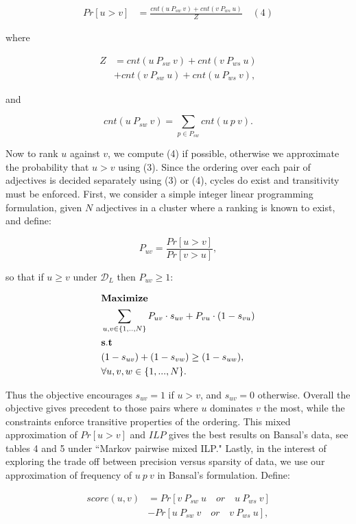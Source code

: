 \begin{align*}
Pr[u > v] &= \frac{cnt(u \: P_{sw} \: v) + cnt(v \: P_{ws} \: u)}{Z} \quad (4)
\end{align*}

where 

\begin{align*}
Z &= cnt(u \: P_{sw} \: v) + cnt(v \: P_{ws} \: u)\\
  &+ cnt(v \: P_{sw} \: u) + cnt(u \: P_{ws} \: v),
\end{align*}

and

\[
  cnt(u \: P_{sw} \: v) = \sum_{p \in P_{sw}} cnt(u \: p \: v).
\]

Now to rank $u$ against $v$, we compute (4) if possible, otherwise we approximate the probability that $u > v$ using (3). Since the ordering over each pair of adjectives is decided separately using (3) or (4), cycles do exist and transitivity must be enforced. First, we consider a simple integer linear programming formulation, given $N$ adjectives in a cluster where a ranking is known to exist, and define: 

\[
  P_{uv} = \frac{Pr[u > v]}{Pr[v > u]},
\]

so that if $u \ge v$ under $\mathcal{D}_L$ then $P_{uv} \ge 1$:

\begin{align*}
  &{\bf Maximize}\\
  &\sum_{u,v \in \{1,..,N\}} P_{uv} \cdot s_{uv} + P_{vu} \cdot (1 - s_{vu}) \\
  &{\bf s.t}\\
  &(1 - s_{uv}) + (1 - s_{vw}) \geq (1 - s_{uw}),  \\
  &\forall u,v,w \in \{1,...,N\}.\\
\end{align*}

Thus the objective encourages $s_{uv} = 1$ if $u > v$, and $s_{uv} = 0$ otherwise. Overall the objective gives precedent to those pairs where $u$ dominates $v$ the most, while the constraints enforce transitive properties of the ordering. This mixed approximation of $Pr[u > v]$ and $ILP$ gives the best results on Bansal's data, see tables 4 and 5 under ``Markov pairwise mixed ILP." Lastly, in the interest of exploring the trade off between precision versus sparsity of data, we use our approximation of frequency of $u \: p \: v$ in Bansal's formulation. Define:

\begin{align*}
  score(u,v) &= Pr[ v \: P_{sw} \: u \quad or \quad u \: P_{ws} \: v] \\
              &- Pr[ u \: P_{sw} \: v  \quad or \quad v \: P_{ws} \: u],
\end{align*}

